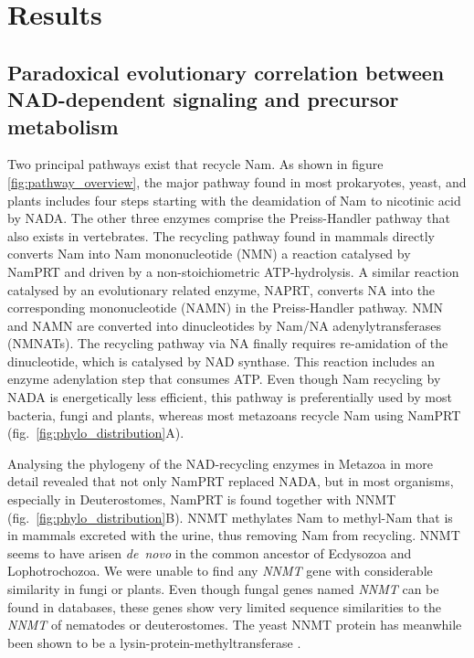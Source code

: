 
\section{Results}

\subsection{Paradoxical evolutionary correlation between NAD-dependent signaling and precursor metabolism}

Two principal pathways exist that recycle Nam. As shown in figure \ref{fig:pathway_overview}, the major pathway found in most prokaryotes, yeast, and plants includes four steps starting with the deamidation of Nam to nicotinic acid by NADA. The other three enzymes comprise the Preiss-Handler pathway that also exists in vertebrates. The recycling pathway found in mammals directly converts Nam into Nam mononucleotide (NMN) a reaction catalysed by NamPRT and driven by a non-stoichiometric ATP-hydrolysis. A similar reaction catalysed by an evolutionary related enzyme, NAPRT, converts NA into the corresponding mononucleotide (NAMN) in the Preiss-Handler pathway. NMN and NAMN are converted into dinucleotides by Nam/NA adenylytransferases (NMNATs). The recycling pathway via NA finally requires re-amidation of the dinucleotide, which is catalysed by NAD synthase. This reaction includes an enzyme adenylation step that consumes ATP. Even though Nam recycling by NADA is energetically less efficient, this pathway is preferentially used by most bacteria, fungi and plants, whereas most metazoans recycle Nam using NamPRT (fig.~\ref{fig:phylo_distribution}A).

Analysing the phylogeny of the NAD-recycling enzymes in Metazoa in more detail revealed that not only NamPRT replaced NADA, but in most organisms, especially in Deuterostomes, NamPRT is found together with NNMT (fig.~\ref{fig:phylo_distribution}B). NNMT methylates Nam to methyl-Nam that is in mammals excreted with the urine, thus removing Nam from recycling. NNMT seems to have arisen \textit{de~novo} in the common ancestor of Ecdysozoa and Lophotrochozoa. We were unable to find any \textit{NNMT} gene with considerable similarity in fungi or plants. Even though fungal genes named \textit{NNMT} can be found in databases, these genes show very limited sequence similarities to the \textit{NNMT} of nematodes or deuterostomes. The yeast NNMT protein has meanwhile been shown to be a lysin-protein-methyltransferase \cite{Wlodarski2011}.

